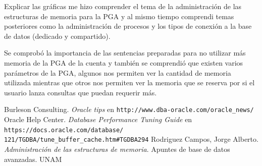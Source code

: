 \documentclass{article}
\begin{document}
Explicar las gráficas me hizo comprender el tema de la administración de las
estructuras de memoria para la PGA y al mismo tiempo comprendi temas posteriores
como la administración de procesos y los tipos de conexión a la base de datos
(dedicado y compartido).

Se comprobó la importancia de las sentencias preparadas para no utilizar más
memoria de la PGA de la cuenta y también se comprendió que existen varios
parámetros de la PGA, algunos nos permiten ver la cantidad de memoria utilizada
mientras que otros nos permiten ver la memoria que se reserva por si el usuario
lanza consultas que puedan requerir más. 

\begin{thebibliography}{99}
     Burleson Consulting. \textit{Oracle tips } en 
    \texttt{http://www.dba-oracle.com/oracle\_news/}
   Oracle Help Center. \textit{Database Performance Tuning 
    Guide} en \texttt{https://docs.oracle.com/database/\\%
    121/TGDBA/tune\_buffer\_cache.htm\#TGDBA294}
   Rodriguez Campos, Jorge Alberto. \textit{Administración de
    las estructuras de memoria}. Apuntes de base de datos avanzadas. UNAM
\end{thebibliography}
\end{document}
